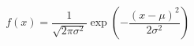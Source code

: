 \begin{equation}
	\label{normalDistribution}
	f(x)= \frac{1}{\sqrt{2\pi \sigma^2}} \exp \left(-\frac{(x-\mu)^2}{2\sigma^2}\right)
\end{equation}
